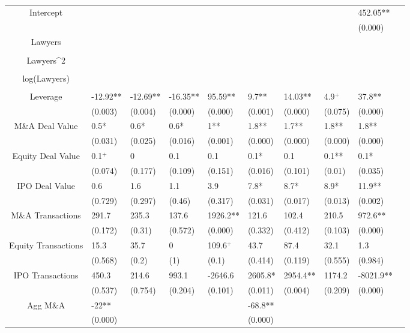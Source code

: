 \documentclass{article}
\begin{document}
\begin{table}[H]
\begin{tabular}{|clllllllll|}
Intercept &  &  &  &  &  &  &  & 452.05** & \\ 
   &  &  &  &  &  &  &  & (0.000) & \\ 
  Lawyers &  &  &  &  &  &  &  &  & \\ 
   &  &  &  &  &  &  &  &  & \\ 
  Lawyers^2 &  &  &  &  &  &  &  &  & \\ 
   &  &  &  &  &  &  &  &  & \\ 
  log(Lawyers) &  &  &  &  &  &  &  &  & \\ 
   &  &  &  &  &  &  &  &  & \\ 
  Leverage & -12.92** & -12.69** & -16.35** & 95.59** & 9.7** & 14.03** & 4.9$^{+}$ & 37.8** & \\ 
   & (0.003) & (0.004) & (0.000) & (0.000) & (0.001) & (0.000) & (0.075) & (0.000) & \\ 
  M\&A Deal Value & 0.5* & 0.6* & 0.6* & 1** & 1.8** & 1.7** & 1.8** & 1.8** & \\ 
   & (0.031) & (0.025) & (0.016) & (0.001) & (0.000) & (0.000) & (0.000) & (0.000) & \\ 
  Equity Deal Value & 0.1$^{+}$ & 0 & 0.1 & 0.1 & 0.1* & 0.1 & 0.1** & 0.1* & \\ 
   & (0.074) & (0.177) & (0.109) & (0.151) & (0.016) & (0.101) & (0.01) & (0.035) & \\ 
  IPO Deal Value & 0.6 & 1.6 & 1.1 & 3.9 & 7.8* & 8.7* & 8.9* & 11.9** & \\ 
   & (0.729) & (0.297) & (0.46) & (0.317) & (0.031) & (0.017) & (0.013) & (0.002) & \\ 
  M\&A Transactions & 291.7 & 235.3 & 137.6 & 1926.2** & 121.6 & 102.4 & 210.5 & 972.6** & \\ 
   & (0.172) & (0.31) & (0.572) & (0.000) & (0.332) & (0.412) & (0.103) & (0.000) & \\ 
  Equity Transactions & 15.3 & 35.7 & 0 & 109.6$^{+}$ & 43.7 & 87.4 & 32.1 & 1.3 & \\ 
   & (0.568) & (0.2) & (1) & (0.1) & (0.414) & (0.119) & (0.555) & (0.984) & \\ 
  IPO Transactions & 450.3 & 214.6 & 993.1 & -2646.6 & 2605.8* & 2954.4** & 1174.2 & -8021.9** & \\ 
   & (0.537) & (0.754) & (0.204) & (0.101) & (0.011) & (0.004) & (0.209) & (0.000) & \\ 
  Agg M\&A & -22** &  &  &  & -68.8** &  &  &  & \\ 
   & (0.000) &  &  &  & (0.000) &  &  &  & \\ 

\end{tabular}
\end{table}
\end{document}
